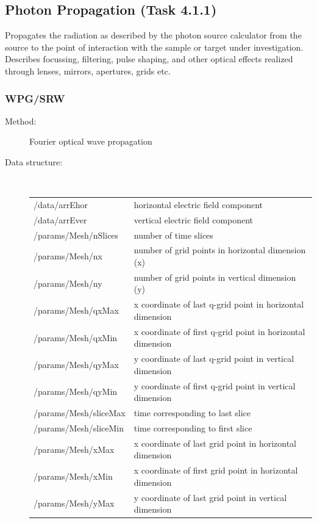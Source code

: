 \documentclass[12pt]{scrartcl}
\begin{document}
\subsection{Photon Propagation (Task 4.1.1)}
Propagates the radiation as described by the photon source calculator from the
source to the point of interaction with the sample or target under
investigation. Describes focussing, filtering, pulse shaping, and other optical
effects realized through lenses, mirrors, apertures, grids etc.
\subsubsection{WPG/SRW\label{sec:interface_prop_wpg}}
\begin{description}
  \item[Method:] Fourier optical wave propagation
  \item[Data structure:]\ \\
{\scriptsize%
\begin{tabular}{l|l}
  \hline
  \hline
  /data/arrEhor     & horizontal electric field component \\
  /data/arrEver     & vertical electric field component \\
  /params/Mesh/nSlices    & number of time slices \\
  /params/Mesh/nx     & number of grid points in horizontal dimension (x) \\
  /params/Mesh/ny     & number of grid points in vertical dimension (y) \\
  /params/Mesh/qxMax        & x coordinate of last q-grid point in horizontal
  dimension \\
  /params/Mesh/qxMin        & x coordinate of first q-grid point in horizontal
  dimension \\
  /params/Mesh/qyMax        & y coordinate of last q-grid point in vertical dimension \\
  /params/Mesh/qyMin        & y coordinate of first q-grid point in vertical
  dimension \\
  /params/Mesh/sliceMax     & time corresponding to last slice \\
  /params/Mesh/sliceMin     & time corresponding to first slice \\
  /params/Mesh/xMax     & x coordinate of last grid point in horizontal dimension \\
  /params/Mesh/xMin     & x coordinate of first grid point in horizontal dimension \\
  /params/Mesh/yMax     & y coordinate of last grid point in vertical dimension \\

\end{tabular}}
\end{description}
\end{document}
